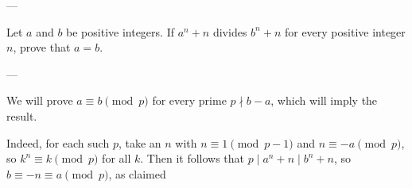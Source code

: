 
---

Let $a$ and $b$ be positive integers. If $a^n+n$ divides $b^n+n$ for every positive integer $n$, prove that $a=b$.

---

We will prove $a\equiv b\pmod p$ for every prime $p\nmid b-a$, which will imply the result.

Indeed, for each such $p$, take an $n$ with $n\equiv1\pmod{p-1}$ and $n\equiv-a\pmod p$, so $k^n\equiv k\pmod p$ for all $k$. Then it follows that $p\mid a^n+n\mid b^n+n$, so $b\equiv-n\equiv a\pmod p$, as claimed

